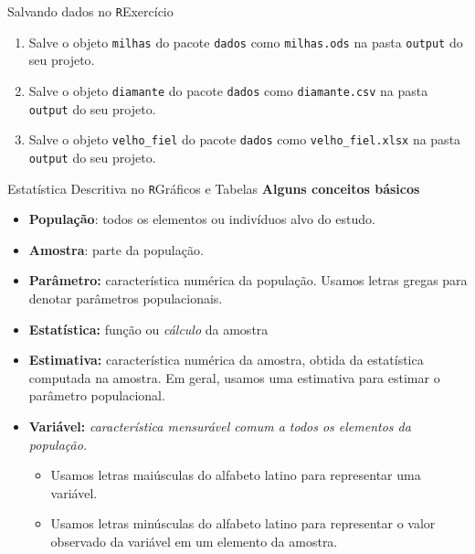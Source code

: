 \documentclass[
  10pt,
  ignorenonframetext,
]{beamer}
\providecommand{\tightlist}{%
  \setlength{\itemsep}{0pt}\setlength{\parskip}{0pt}}
\begin{document}
\begin{frame}[fragile]{Salvando dados no \texttt{R}\newline Exercício}
\protect\hypertarget{salvando-dados-no-rexercuxedcio}{}
\begin{enumerate}
\tightlist
\item
  Salve o objeto \texttt{milhas} do pacote \texttt{dados} como
  \texttt{milhas.ods} na pasta \texttt{output} do seu projeto.
\item
  Salve o objeto \texttt{diamante} do pacote \texttt{dados} como
  \texttt{diamante.csv} na pasta \texttt{output} do seu projeto.
\item
  Salve o objeto \texttt{velho\_fiel} do pacote \texttt{dados} como
  \texttt{velho\_fiel.xlsx} na pasta \texttt{output} do seu projeto.
\end{enumerate}
\end{frame}

\begin{frame}{Estatística Descritiva no \texttt{R}\newline Gráficos e
Tabelas}
\protect\hypertarget{estatuxedstica-descritiva-no-rgruxe1ficos-e-tabelas}{}
\textbf{Alguns conceitos básicos}

\begin{itemize}
\tightlist
\item
  \textbf{População}: todos os elementos ou indivíduos alvo do estudo.
\item
  \textbf{Amostra}: parte da população.
\item
  \textbf{Parâmetro:} característica numérica da população. Usamos
  letras gregas para denotar parâmetros populacionais.
\item
  \textbf{Estatística:} função ou \emph{cálculo} da amostra
\item
  \textbf{Estimativa:} característica numérica da amostra, obtida da
  estatística computada na amostra. Em geral, usamos uma estimativa para
  estimar o parâmetro populacional.
\item
  \textbf{Variável:} \emph{característica mensurável comum a todos os
  elementos da população.}

  \begin{itemize}
  \tightlist
  \item
    Usamos letras maiúsculas do alfabeto latino para representar uma
    variável.
  \item
    Usamos letras minúsculas do alfabeto latino para representar o valor
    observado da variável em um elemento da amostra.
  \end{itemize}
\end{itemize}
\end{frame}
\end{document}
